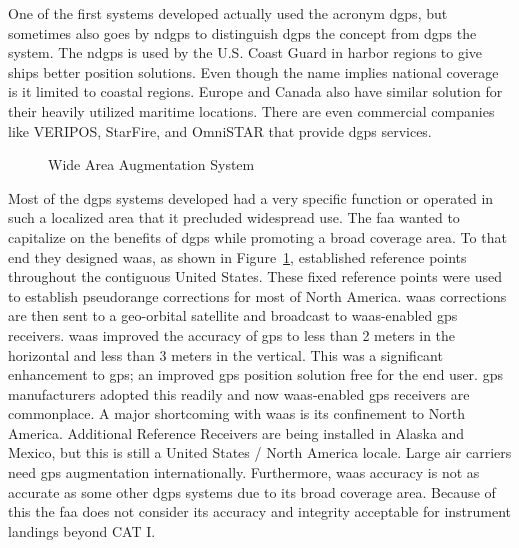 One of the first systems developed actually used the acronym \ac{dgps}, but sometimes also goes by \ac{ndgps} to distinguish \ac{dgps} the concept from \ac{dgps} the system.  The \ac{ndgps} is used by the U.S. Coast Guard in harbor regions to give ships better position solutions.  Even though the name implies national coverage is it limited to coastal regions. Europe and Canada also have similar solution for their heavily utilized maritime locations. There are even commercial companies like VERIPOS, StarFire, and OmniSTAR that provide \ac{dgps} services.

\begin{figure}
	\centering
	\caption{Wide Area Augmentation System\citep[]{FAA_WAAS}}
	\label{fig:FAA_WAAS}
\end{figure}

Most of the \ac{dgps} systems developed had a very specific function or operated in such a localized area that it precluded widespread use. The \ac{faa} wanted to capitalize on the benefits of \ac{dgps} while promoting a broad coverage area. To that end they designed \ac{waas}, as shown in Figure~\ref{fig:FAA_WAAS}, established reference points throughout the contiguous United States. These fixed reference points were used to establish pseudorange corrections for most of North America.  \ac{waas} corrections are then sent to a geo-orbital satellite and broadcast to \ac{waas}-enabled \ac{gps} receivers.  \ac{waas} improved the accuracy of \ac{gps} to less than 2 meters in the horizontal and less than 3 meters in the vertical. This was a significant enhancement to \ac{gps}; an improved \ac{gps} position solution free for the end user.  \ac{gps} manufacturers adopted this readily and now \ac{waas}-enabled \ac{gps} receivers are commonplace. A major shortcoming with \ac{waas} is its confinement to North America.  Additional Reference Receivers are being installed in Alaska and Mexico, but this is still a United States / North America locale. Large air carriers need \ac{gps} augmentation internationally. Furthermore, \ac{waas} accuracy is not as accurate as some other \ac{dgps} systems due to its broad coverage area.  Because of this the \ac{faa} does not consider its accuracy and integrity acceptable for instrument landings beyond CAT I.


